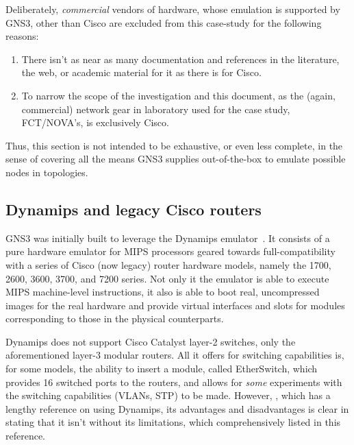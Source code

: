 

Deliberately, \emph{commercial} vendors of hardware, whose emulation is supported by GNS3, other than Cisco are excluded from this case-study for the following reasons:

\begin{enumerate}
  \item There isn't as near as many documentation and references in the literature, the web, or academic material for it as there is for Cisco.
  \item To narrow the scope of the investigation and this document, as the (again, commercial) network gear in laboratory used for the case study, FCT/NOVA's, is exclusively Cisco.
\end{enumerate}

Thus, this section is not intended to be exhaustive, or even less complete, in the sense of covering all the means GNS3 supplies out-of-the-box to emulate possible nodes in topologies.

\subsection{Dynamips and legacy Cisco routers}
\label{subsec:gns3dynamipslegacy}

GNS3 was initially built to leverage the Dynamips emulator~\cite{thebookofgns3}.
It consists of a pure hardware emulator for MIPS processors geared towards full-compatibility with a series of Cisco (now legacy) router hardware models, namely the 1700, 2600, 3600, 3700, and 7200 series. %
Not only it the emulator is able to execute MIPS machine-level instructions, it also is able to boot real, uncompressed images for the real hardware and provide virtual interfaces and slots for modules corresponding to those in the physical counterparts.

Dynamips does not support Cisco Catalyst layer-2 switches, only the aforementioned layer-3 modular routers.
All it offers for switching capabilities is, for some models, the ability to insert a module, called EtherSwitch, which provides 16 switched ports to the routers, and allows for \emph{some} experiments with the switching capabilities (VLANs, STP) to be made.
However, \cite{thebookofgns3}, which has a lengthy reference on using Dynamips, its advantages and disadvantages is clear in stating that it isn't without its limitations, which comprehensively listed in this reference.

